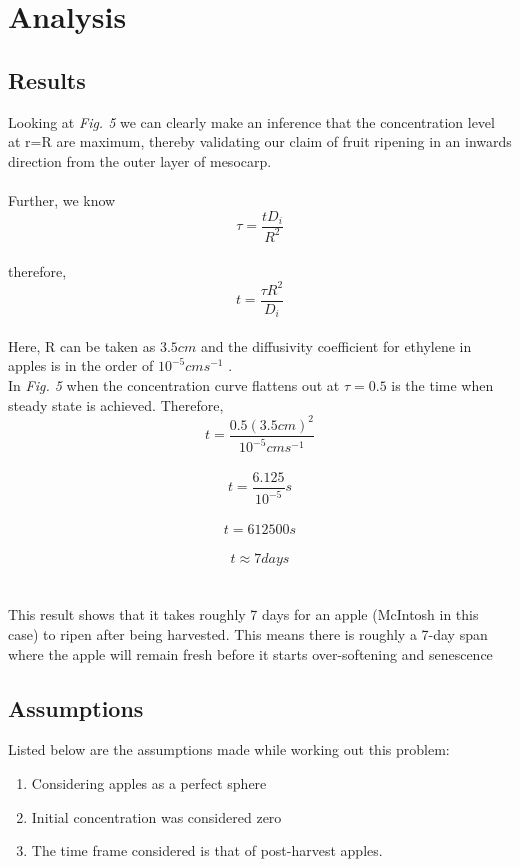 \documentclass[10pt, a4paper]{article}
\begin{document}
\section{Analysis}
\subsection{Results}
Looking at \emph{Fig. 5} we can clearly make an inference that the concentration level at r=R are maximum, thereby validating our claim of fruit ripening in an inwards direction from the outer layer of mesocarp. \\
\\
Further, we know\\
\[\tau=\frac{tD_i}{R^2}\]\\
therefore,\\

\[t=\frac{\tau R^2}{D_i}\]\\

Here, R can be taken as $3.5cm$ \cite{McIntosh} and the diffusivity coefficient for ethylene in apples is in the order of $10^{-5} cm s^{-1}$ \cite{diffusivityCoeff}.\\
In \emph{Fig. 5} when the concentration curve flattens out at $\tau=0.5$ is the time when steady state is achieved. Therefore, \\

\[t=\frac{0.5 (3.5cm)^2}{10^{-5}cm s^{-1}}\]\\
\[t=\frac{6.125}{10^{-5}} s\]\\
\[t=612500s\]\\
\[t\approx7days\]\\
\\
This result shows that it takes roughly 7 days for an apple (McIntosh in this case) to ripen after being harvested. This means there is roughly a 7-day span where the apple will remain fresh before it starts over-softening and senescence \cite{WSU}

\subsection{Assumptions}
Listed below are the assumptions made while working out this problem:
\begin{enumerate}
    \item Considering apples as a perfect sphere
    \item Initial concentration was considered zero
    \item The time frame considered is that of post-harvest apples.
\end{enumerate}
\end{document}
